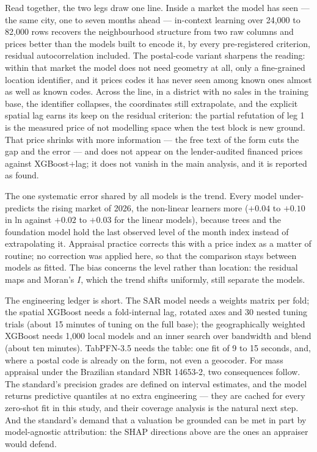 \documentclass[11pt,a4paper]{article}
\begin{document}
Read together, the two legs draw one line. Inside a market the model has seen --- the same city,
one to seven months ahead --- in-context learning over 24{,}000 to 82{,}000 rows recovers the
neighbourhood structure from two raw columns and prices better than the models built to encode
it, by every pre-registered criterion, residual autocorrelation included. The postal-code
variant sharpens the reading: within that market the model does not need geometry at all, only a
fine-grained location identifier, and it prices codes it has never seen among known ones almost
as well as known codes. Across the line, in a district with no sales in the training base, the
identifier collapses, the coordinates still extrapolate, and the explicit spatial lag earns its
keep on the residual criterion: the partial refutation of leg 1 is the measured price of not
modelling space when the test block is new ground. That price shrinks with more information ---
the free text of the form cuts the gap and the error --- and does not appear on the
lender-audited financed prices against XGBoost+lag; it does not vanish in the main analysis, and
it is reported as found.

The one systematic error shared by all models is the trend. Every model under-predicts the
rising market of 2026, the non-linear learners more ($+0.04$ to $+0.10$ in ln against $+0.02$ to
$+0.03$ for the linear models), because trees and the foundation model hold the last observed
level of the month index instead of extrapolating it. Appraisal practice corrects this with a
price index as a matter of routine; no correction was applied here, so that the comparison
stays between models as fitted. The bias concerns the level rather than location: the residual maps and
Moran's $I$, which the trend shifts uniformly, still separate the models.

The engineering ledger is short. The SAR model needs a weights matrix per fold; the spatial
XGBoost needs a fold-internal lag, rotated axes and 30 nested tuning trials (about 15 minutes of
tuning on the full base); the geographically weighted XGBoost needs 1{,}000 local models and an
inner search over bandwidth and blend (about ten minutes). TabPFN-3.5 needs the table: one fit
of 9 to 15 seconds, and, where a postal code is already on the form, not even a geocoder. For
mass appraisal under the Brazilian standard NBR 14653-2, two consequences follow. The
standard's precision grades are defined on interval estimates, and the model returns predictive
quantiles at no extra engineering --- they are cached for every zero-shot fit in this study, and
their coverage analysis is the natural next step. And the standard's demand that a valuation be
grounded can be met in part by model-agnostic attribution: the SHAP directions above are the
ones an appraiser would defend.
\end{document}
